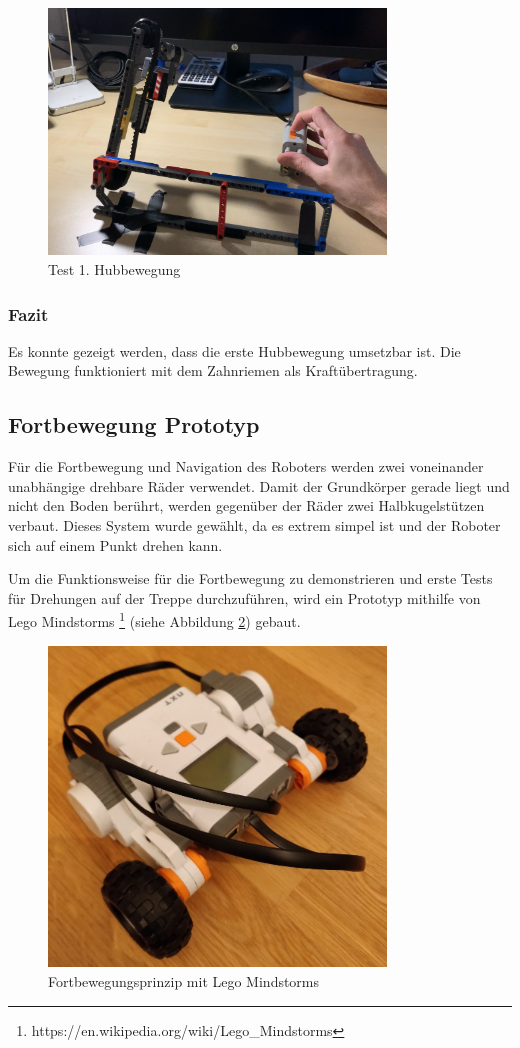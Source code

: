 \begin{figure}[H]
  \includegraphics[width=0.8\textwidth]{img/Test 1. Hub.png}
  \centering
  \caption{Test 1. Hubbewegung}
  \label{fig:prototyp-2-treppensteigen}
\end{figure}

\subsubsection{Fazit}
Es konnte gezeigt werden, dass die erste Hubbewegung umsetzbar ist. Die Bewegung funktioniert mit dem Zahnriemen als Kraftübertragung.

\newpage
\subsection{Fortbewegung Prototyp}
Für die Fortbewegung und Navigation des Roboters werden zwei voneinander unabhängige drehbare Räder verwendet. Damit der Grundkörper gerade liegt und nicht den Boden berührt, werden gegenüber der Räder zwei Halbkugelstützen verbaut.
Dieses System wurde gewählt, da es extrem simpel ist und der Roboter sich auf einem Punkt drehen kann.

Um die Funktionsweise für die Fortbewegung zu demonstrieren und erste Tests für Drehungen auf
der Treppe durchzuführen, wird ein Prototyp mithilfe von Lego Mindstorms \footnote{https://en.wikipedia.org/wiki/Lego\_Mindstorms} (siehe Abbildung \ref{fig:lego-mindstorms}) gebaut.

\begin{figure}[H]
  \includegraphics[width=0.8\textwidth]{img/Fortbewegung/fortbewegung.png}
  \centering
  \caption{Fortbewegungsprinzip mit Lego Mindstorms}
  \label{fig:lego-mindstorms}
\end{figure}




